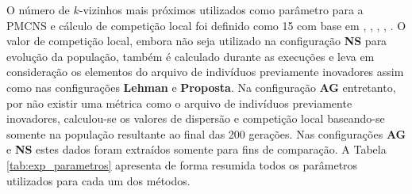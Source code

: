 O número de $k$-vizinhos mais próximos utilizados como parâmetro para a PMCNS e cálculo de competição local foi definido como 15 com base em \cite{lehman2008exploiting} , \cite{lehman2011abandoning}, \cite{lehman2011evolving}, \cite{lehman2010revising}, \cite{gomes2012progressive}. O valor de competição local, embora não seja utilizado na configuração \textbf{NS} para evolução da população, também é calculado durante as execuções e leva em consideração os elementos do arquivo de indivíduos previamente inovadores assim como nas configurações \textbf{Lehman} e \textbf{Proposta}. Na configuração \textbf{AG} entretanto, por não existir uma métrica como o arquivo de indivíduos previamente inovadores, calculou-se os valores de dispersão e competição local baseando-se somente na população resultante ao final das 200 gerações. Nas configurações \textbf{AG} e \textbf{NS} estes dados foram extraídos somente para fins de comparação. A Tabela \ref{tab:exp_parametros} apresenta de forma resumida todos os parâmetros utilizados para cada um dos métodos.

